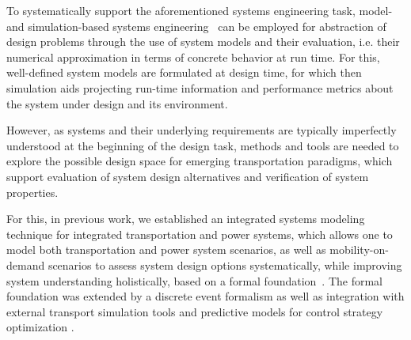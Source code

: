 \documentclass[a4paper,twoside]{article}
\begin{document}
	
	To systematically support the aforementioned systems engineering task, model- and simulation-based systems engineering~\cite{gianni2014modeling} can be employed for abstraction of design problems through the use of system models and their evaluation, i.e. their numerical approximation in terms of concrete behavior at run time. For this, well-defined system models are formulated at design time, for which then simulation aids projecting run-time information and performance metrics about the system under design and its environment. 

	However, as systems and their underlying requirements are typically imperfectly understood at the beginning of the design task, methods and tools are needed to explore the possible design space for emerging transportation paradigms, which support evaluation of system design alternatives and verification of system properties. 
	
	
	For this, in previous work, we established an integrated systems modeling technique for integrated transportation and power systems, which allows one to model both transportation and power system scenarios, as well as mobility-on-demand scenarios to assess system design options systematically, while improving system understanding holistically, based on a formal foundation~\cite{ascher_hackenberg_2015,ascher_hackenberg_2016,ascher_hackenberg_2017}. The formal foundation was extended by a discrete event formalism \cite{ascher2023discrete} as well as integration with external transport simulation tools and predictive models for control strategy optimization \cite{ascher_hackenberg_albayrak_2023}.
	
\end{document}
